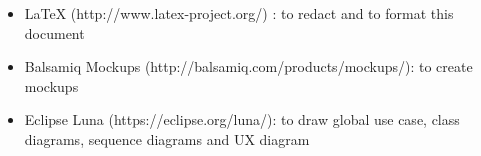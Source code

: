 \begin{itemize}
	\item LaTeX (http://www.latex-project.org/) : to redact and to format this document
	\item Balsamiq Mockups (http://balsamiq.com/products/mockups/): to create mockups
	\item Eclipse Luna (https://eclipse.org/luna/): to draw global use case, class diagrams, sequence diagrams and UX diagram
\end{itemize}